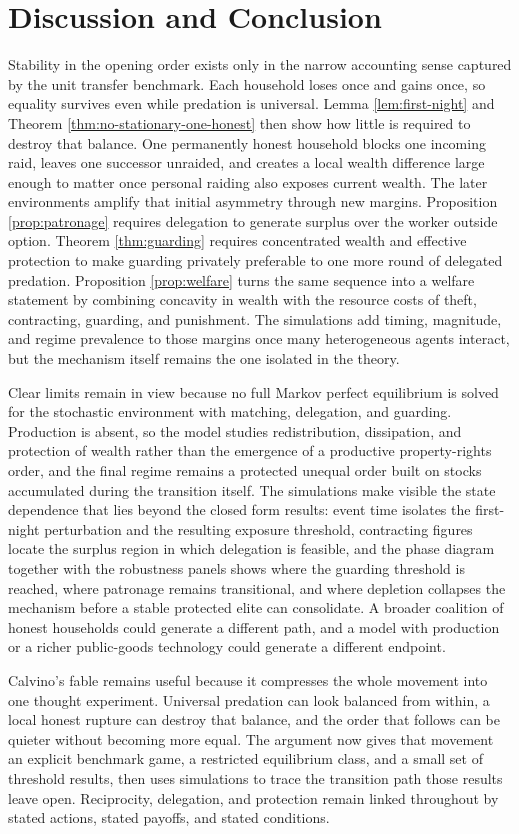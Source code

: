\section{Discussion and Conclusion}
\label{sec:discussion}

Stability in the opening order exists only in the narrow accounting sense captured by the unit transfer benchmark. Each household loses once and gains once, so equality survives even while predation is universal. Lemma \ref{lem:first-night} and Theorem \ref{thm:no-stationary-one-honest} then show how little is required to destroy that balance. One permanently honest household blocks one incoming raid, leaves one successor unraided, and creates a local wealth difference large enough to matter once personal raiding also exposes current wealth. The later environments amplify that initial asymmetry through new margins. Proposition \ref{prop:patronage} requires delegation to generate surplus over the worker outside option. Theorem \ref{thm:guarding} requires concentrated wealth and effective protection to make guarding privately preferable to one more round of delegated predation. Proposition \ref{prop:welfare} turns the same sequence into a welfare statement by combining concavity in wealth with the resource costs of theft, contracting, guarding, and punishment. The simulations add timing, magnitude, and regime prevalence to those margins once many heterogeneous agents interact, but the mechanism itself remains the one isolated in the theory.

Clear limits remain in view because no full Markov perfect equilibrium is solved for the stochastic environment with matching, delegation, and guarding. Production is absent, so the model studies redistribution, dissipation, and protection of wealth rather than the emergence of a productive property-rights order, and the final regime remains a protected unequal order built on stocks accumulated during the transition itself. The simulations make visible the state dependence that lies beyond the closed form results: event time isolates the first-night perturbation and the resulting exposure threshold, contracting figures locate the surplus region in which delegation is feasible, and the phase diagram together with the robustness panels shows where the guarding threshold is reached, where patronage remains transitional, and where depletion collapses the mechanism before a stable protected elite can consolidate. A broader coalition of honest households could generate a different path, and a model with production or a richer public-goods technology could generate a different endpoint.

Calvino's fable remains useful because it compresses the whole movement into one thought experiment. Universal predation can look balanced from within, a local honest rupture can destroy that balance, and the order that follows can be quieter without becoming more equal. The argument now gives that movement an explicit benchmark game, a restricted equilibrium class, and a small set of threshold results, then uses simulations to trace the transition path those results leave open. Reciprocity, delegation, and protection remain linked throughout by stated actions, stated payoffs, and stated conditions.
